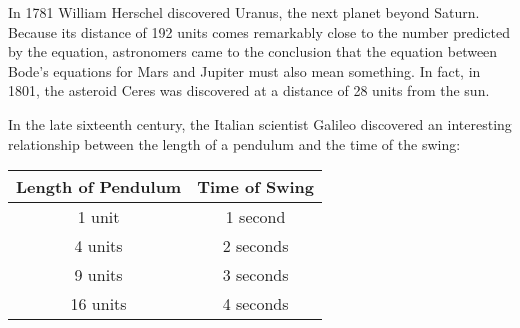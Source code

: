 \documentclass[letterpaper, landscape]{exam}
\begin{document}
\begin{questions}
\begin{parts}
    \end{parts}

    In 1781 William Herschel discovered Uranus, the next planet beyond Saturn.  Because its distance
    of 192 units comes remarkably close to the number predicted by the equation, astronomers came to
    the conclusion that the equation between Bode's equations for Mars and Jupiter must also mean
    something.  In fact, in 1801, the asteroid Ceres was discovered at a distance of 28 units from
    the sun.

    \question

    In the late sixteenth century, the Italian scientist Galileo discovered an interesting
    relationship between the length of a pendulum and the time of the swing:

    \begin{tabular}{cc}
      \toprule
      Length of Pendulum & Time of Swing \\
      \midrule
      1 unit             & 1 second \\
      4 units            & 2 seconds \\
      9 units            & 3 seconds \\
      16 units           & 4 seconds \\
      \bottomrule
    \end{tabular}

\end{questions}
\end{document}
